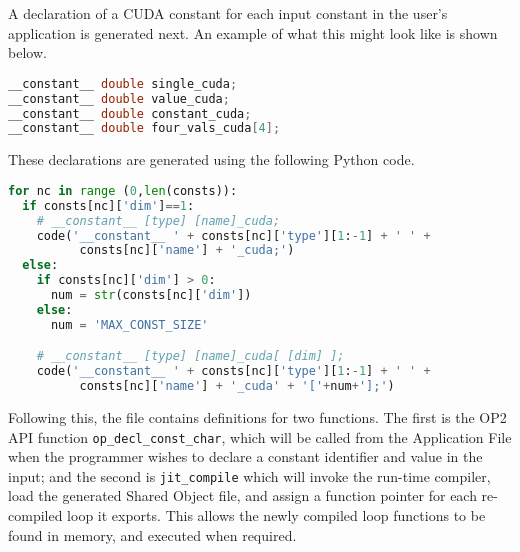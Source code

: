 A declaration of a CUDA constant for each input constant in the user's application is generated next. An example of what this might look like is shown below.
\begin{lstlisting}[backgroundcolor=\color{red!20}, language=C]
__constant__ double single_cuda;
__constant__ double value_cuda;
__constant__ double constant_cuda;
__constant__ double four_vals_cuda[4];
\end{lstlisting}

These declarations are generated using the following Python code.
\begin{lstlisting}[backgroundcolor = \color{lightgray!20}, language=Python]
for nc in range (0,len(consts)):
  if consts[nc]['dim']==1:
    # __constant__ [type] [name]_cuda;
    code('__constant__ ' + consts[nc]['type'][1:-1] + ' ' +
          consts[nc]['name'] + '_cuda;')
  else:
    if consts[nc]['dim'] > 0:
      num = str(consts[nc]['dim'])
    else:
      num = 'MAX_CONST_SIZE'

    # __constant__ [type] [name]_cuda[ [dim] ];
    code('__constant__ ' + consts[nc]['type'][1:-1] + ' ' +
          consts[nc]['name'] + '_cuda' + '['+num+'];')
\end{lstlisting}

Following this, the file contains definitions for two functions. The first is the OP2 API function \verb|op_decl_const_char|, which will be called from the Application File when the programmer wishes to declare a constant identifier and value in the input; and the second is \verb|jit_compile| which will invoke the run-time compiler, load the generated Shared Object file, and assign a function pointer for each re-compiled loop it exports. This allows the newly compiled loop functions to be found in memory, and executed when required.

